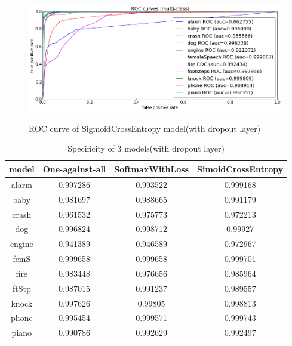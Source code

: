 \begin{figure}[h!]
\includegraphics[scale=0.35]{../image/chapter2/rocSCE.png}
\label{fig:rocSCE}
\caption{ROC curve of SigmoidCrossEntropy model(with dropout layer)}
\end{figure}
\begin{table}[h!]
	\caption{Specificity of 3 models(with dropout layer)}
	\label{tab:spec}
	\begin{tabular}{|c|c|c|c|}
		\hline	model	&	\textbf{One-against-all}	&	\textbf{SoftmaxWithLoss}	&	\textbf{SimoidCrossEntropy}	\\
		\hline	alarm 	&	0.997286	&	0.993522	&	0.999168	\\
		\hline	baby 	&	0.981697	&	0.988665	&	0.991179	\\
		\hline	crash 	&	0.961532	&	0.975773	&	0.972213	\\
		\hline	dog 	&	0.996824	&	0.998712	&	0.99927	\\
		\hline	engine 	&	0.941389	&	0.946589	&	0.972967	\\
		\hline	femS 	&	0.999658	&	0.999658	&	0.999701	\\
		\hline	fire 	&	0.983448	&	0.976656	&	0.985964	\\
		\hline	ftStp 	&	0.987015	&	0.991237	&	0.989557	\\
		\hline	knock 	&	0.997626	&	0.99805	&	0.998813	\\
		\hline	phone 	&	0.995454	&	0.999571	&	0.999743	\\
		\hline	piano 	&	0.990786	&	0.992629	&	0.992497	\\
		\hline
	\end{tabular} 
\end{table}

